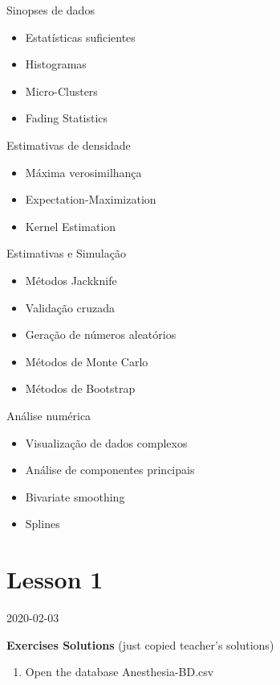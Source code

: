 \documentclass[]{book}
\providecommand{\tightlist}{%
  \setlength{\itemsep}{0pt}\setlength{\parskip}{0pt}}
\begin{document}
Sinopses de dados

\begin{itemize}
\tightlist
\item
  Estatísticas suficientes
\item
  Histogramas
\item
  Micro-Clusters
\item
  Fading Statistics
\end{itemize}

Estimativas de densidade

\begin{itemize}
\tightlist
\item
  Máxima verosimilhança
\item
  Expectation-Maximization
\item
  Kernel Estimation
\end{itemize}

Estimativas e Simulação

\begin{itemize}
\tightlist
\item
  Métodos Jackknife
\item
  Validação cruzada
\item
  Geração de números aleatórios
\item
  Métodos de Monte Carlo
\item
  Métodos de Bootstrap
\end{itemize}

Análise numérica

\begin{itemize}
\tightlist
\item
  Visualização de dados complexos
\item
  Análise de componentes principais
\item
  Bivariate smoothing
\item
  Splines
\end{itemize}

\hypertarget{lesson-1}{%
\section{Lesson 1}\label{lesson-1}}

2020-02-03

\textbf{Exercises Solutions} (just copied teacher's solutions)

\begin{enumerate}
\def\labelenumi{\arabic{enumi}.}
\tightlist
\item
  Open the database Anesthesia-BD.csv
\end{enumerate}
\end{document}

